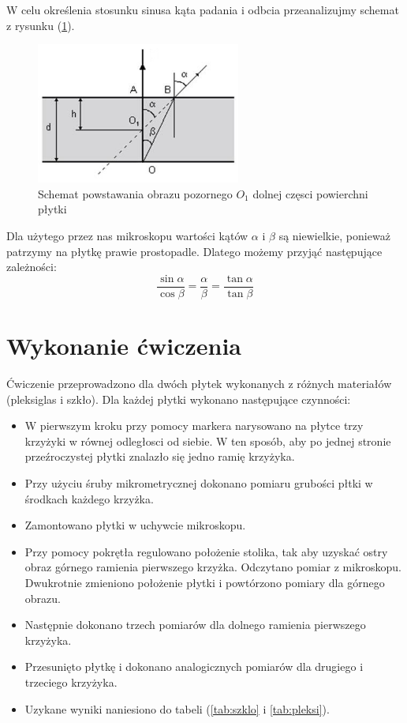 \documentclass [a4paper,11pt]{article}
\begin{document}
	W celu określenia stosunku sinusa kąta padania i odbcia przeanalizujmy schemat z rysunku (\ref{fig:schemat}). 
	\begin{center}
	
			\begin{figure}[!h]
				\centering
			\label{fig:schemat}
			\caption{Schemat powstawania obrazu pozornego $O_1$ dolnej częsci powierchni płytki }
			\includegraphics[width=0.6\textwidth]{schemat_zalamanie}
		\end{figure}
	\end{center}

	
	Dla użytego przez nas mikroskopu wartości kątów $\alpha$ i $\beta$ są niewielkie, ponieważ patrzymy na płytkę prawie prostopadle. Dlatego możemy przyjąć następujące zależności:
	\begin{equation}
		\frac{\sin \alpha}{\cos \beta}=\frac{ \alpha}{ \beta}=\frac{\tan \alpha}{\tan \beta}
	\end{equation}
	
		
	\section{Wykonanie ćwiczenia}
	Ćwiczenie przeprowadzono dla dwóch płytek wykonanych z różnych materiałów (pleksiglas i szkło).
	Dla każdej płytki wykonano następujące czynności:
	\begin{itemize}
		\item W pierwszym kroku przy pomocy markera narysowano na płytce trzy krzyżyki w równej odległosci od siebie.
		W ten sposób, aby po jednej stronie przeźroczystej płytki znalazło się jedno ramię krzyżyka.
		\item 
			Przy użyciu śruby mikrometrycznej dokonano pomiaru grubości płtki w 
			środkach każdego krzyżka.
		\item Zamontowano płytki w uchywcie mikroskopu. 
		\item Przy pomocy pokrętła regulowano położenie stolika, tak aby uzyskać ostry obraz 
		górnego ramienia pierwszego krzyżka.  Odczytano pomiar z mikroskopu. Dwukrotnie zmieniono położenie płytki i powtórzono pomiary dla górnego obrazu.
		\item Następnie dokonano trzech pomiarów dla dolnego ramienia pierwszego krzyżyka.
		\item Przesunięto płytkę i dokonano analogicznych pomiarów dla drugiego i trzeciego krzyżyka.
		\item Uzykane wyniki naniesiono do tabeli (\ref{tab:szklo} i \ref{tab:pleksi}).  
	\end{itemize}
	
\end{document}
